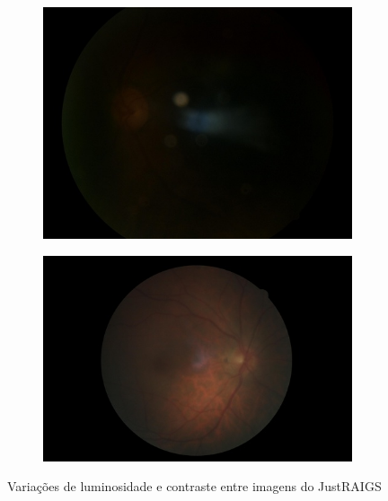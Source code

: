\documentclass[12pt]{article}
\begin{document}
\begin{figure}
\begin{subfigure}[b]{0.2\textwidth}
        \label{fig:images_variations_1_2}
    \end{subfigure}
    \hfill
    \begin{subfigure}[b]{0.2\textwidth}
        \centering
        \includegraphics[width=\textwidth]{images/examples_from_dataset/TRAIN013211.JPG}
        \label{fig:images_variations_1_3}
    \end{subfigure}
    \hfill
    \begin{subfigure}[b]{0.2\textwidth}
        \centering
        \includegraphics[width=\textwidth]{images/examples_from_dataset/TRAIN061871.JPG}
        \label{fig:images_variations_1_4}
    \end{subfigure}
    \caption{Variações de luminosidade e contraste entre imagens do JustRAIGS}
    \label{fig:images_variations_1}
\end{figure}
\end{document}
